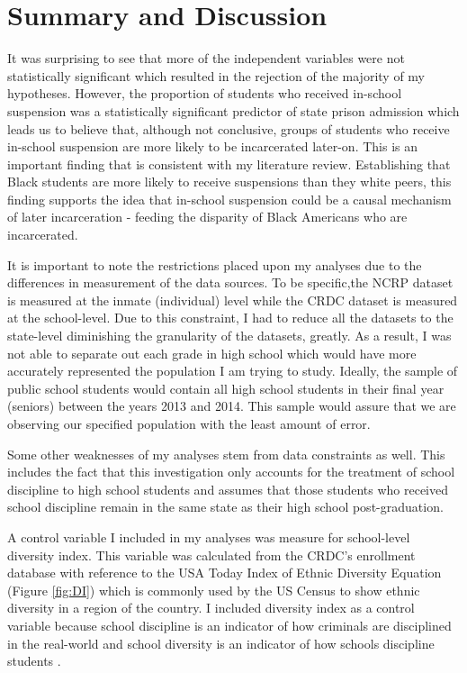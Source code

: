 \documentclass[12pt]{article}
\begin{document}
\clearpage

\section*{Summary and Discussion}
It was surprising to see that more of the independent variables were not statistically significant which resulted in the rejection of the majority of my hypotheses. However, the proportion of students who received in-school suspension was a statistically significant predictor of state prison admission which leads us to believe that, although not conclusive, groups of students who receive in-school suspension are more likely to be incarcerated later-on. This is an important finding that is consistent with my literature review. Establishing that Black students are more likely to receive suspensions than they white peers, this finding supports the idea that in-school suspension could be a causal mechanism of later incarceration - feeding the disparity of Black Americans who are incarcerated.

It is important to note the restrictions placed upon my analyses due to the differences in measurement of the data sources. To be specific,the NCRP dataset is measured at the inmate (individual) level while the CRDC dataset is measured at the school-level. Due to this constraint, I had to reduce all the datasets to the state-level diminishing the granularity of the datasets, greatly. As a result, I was not able to separate out each grade in high school which would have more accurately represented the population I am trying to study. Ideally, the sample of public school students would contain all high school students in their final year (seniors) between the years 2013 and 2014. This sample would assure that we are observing our specified population with the least amount of error. 

Some other weaknesses of my analyses stem from data constraints as well. This includes the fact that this investigation only accounts for the treatment of school discipline to high school students and assumes that those students who received school discipline remain in the same state as their high school post-graduation. 

A control variable I included in my analyses was measure for school-level diversity index. This variable was calculated from the CRDC's enrollment database with reference to the USA Today Index of Ethnic Diversity Equation (Figure \ref{fig:DI}) which is commonly used by the US Census to show ethnic diversity in a region of the country. I included diversity index as a control variable because school discipline is an indicator of how criminals are disciplined in the real-world and school diversity is an indicator of how schools discipline students \cite{Moak2016}.  
\end{document}
